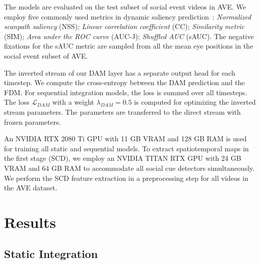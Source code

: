 \documentclass{article}
\begin{document}
The models are evaluated on the test subset of social event videos in AVE.
We employ five commonly used metrics in dynamic saliency prediction~\cite{tavakoli2020deep,tsiami2020stavis}: 
\textit{Normalized scanpath saliency} (NSS); \textit{Linear correlation coefficient} (CC); \textit{Similarity metric} (SIM); \textit{Area under the ROC curve} (AUC-J); \textit{Shuffled AUC} (sAUC). The negative fixations for the sAUC metric are sampled from all the mean eye positions in the social event subset of AVE.

The inverted stream of our DAM layer has a separate output head for each timestep. We compute the cross-entropy between the DAM prediction and the FDM. For sequential integration models, the loss is summed over all timesteps. The loss $\mathcal{L}_{\!D\!A\!M}$ with a weight $\lambda_{\!D\!A\!M}=0.5$ is computed for optimizing the inverted stream parameters. The parameters are transferred to the direct stream with frozen parameters.


An NVIDIA RTX 2080 Ti GPU with 11 GB VRAM and 128 GB RAM is used for training all static and sequential models. To extract spatiotemporal maps in the first stage (SCD), we employ an NVIDIA TITAN RTX GPU with 24 GB VRAM and 64 GB RAM to accommodate all social cue detectors simultaneously. We perform the SCD feature extraction in a preprocessing step for all videos in the AVE dataset. 
 
\section{Results}
\label{sec:results}

\subsection{Static Integration}
\end{document}
